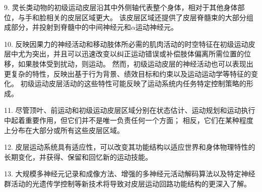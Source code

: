 9. 灵长类动物的初级运动皮层沿其中外侧轴代表整个身体，相对于其他身体部位，与手和脸相关的皮层区域更大。
该皮层区域还提供了皮层脊髓束的大部分组成部分，并投射到脊髓中的中间神经元和$ \alpha $运动神经元。


10. 反映因果力的神经活动和移动肢体所必需的肌肉活动的时空特征在初级运动皮层中尤为突出，并且可以迅速改变以纠正运动错误或补偿肢体偏离所需位置的位移，如果肢体受到扰动，则运动。
然而，初级运动皮层的神经活动也可以表现出更复杂的特性，反映出基于行为背景、绩效目标和约束以及运动运动学等特征的变化。
初级运动皮层活动的这些特性可能反映了运动系统内任务特定控制策略的形成。


11. 尽管顶叶、前运动和初级运动皮层区域分别在状态估计、运动规划和运动执行中起着重要作用，但它们并不是唯一负责任何一个方面；
相反，它们在某种程度上分布在大部分或所有这些皮层区域。


12. 皮层运动系统具有适应性，可以改变其功能结构以适应世界和身体物理特性的长期变化，并获得、保留和回忆新的运动技能。


13. 大规模多神经元记录和成像方法、增强的多神经元活动解码算法以及特定神经群活动的光遗传学控制等新技术将导致对皮层运动回路功能结构的更深入了解。


